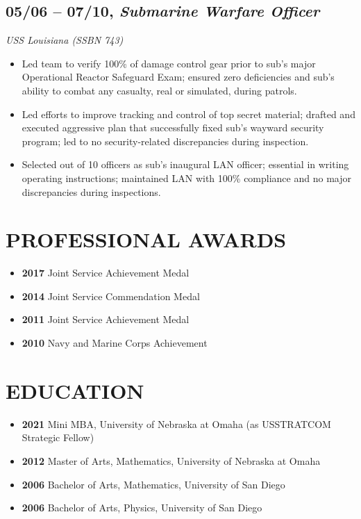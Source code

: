 \documentclass[10pt]{article}
\def\tightlist{}
\begin{document}
\hypertarget{submarine-warfare-officer}{%
\subsection{\texorpdfstring{05/06 -- 07/10, \textbf{\emph{Submarine
Warfare
Officer}}}{05/06 -- 07/10, Submarine Warfare Officer}}\label{submarine-warfare-officer}}

\emph{USS Louisiana (SSBN 743)}

\begin{itemize}
\tightlist
\item
  Led team to verify 100\% of damage control gear prior to sub's major
  Operational Reactor Safeguard Exam; ensured zero deficiencies and
  sub's ability to combat any casualty, real or simulated, during
  patrols.
\item
  Led efforts to improve tracking and control of top secret material;
  drafted and executed aggressive plan that successfully fixed sub's
  wayward security program; led to no security-related discrepancies
  during inspection.
\item
  Selected out of 10 officers as sub's inaugural LAN officer; essential
  in writing operating instructions; maintained LAN with 100\%
  compliance and no major discrepancies during inspections.
\end{itemize}

\hypertarget{professional-awards}{%
\section{PROFESSIONAL AWARDS}\label{professional-awards}}

\begin{itemize}
\tightlist
\item
  \textbf{2017} Joint Service Achievement Medal
\item
  \textbf{2014} Joint Service Commendation Medal
\item
  \textbf{2011} Joint Service Achievement Medal
\item
  \textbf{2010} Navy and Marine Corps Achievement
\end{itemize}

\hypertarget{education}{%
\section{EDUCATION}\label{education}}

\begin{itemize}
\tightlist
\item
  \textbf{2021} Mini MBA, University of Nebraska at Omaha (as USSTRATCOM
  Strategic Fellow)
\item
  \textbf{2012} Master of Arts, Mathematics, University of Nebraska at
  Omaha
\item
  \textbf{2006} Bachelor of Arts, Mathematics, University of San Diego
\item
  \textbf{2006} Bachelor of Arts, Physics, University of San Diego
\end{itemize}
\end{document}
